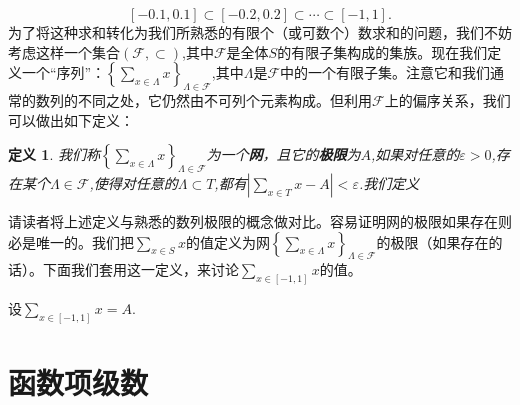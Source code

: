 \documentclass{article}
\newtheorem{definition}{定义}[subsection]
\begin{document}
$$[-0.1,0.1]\subset[-0.2,0.2]\subset\cdots\subset[-1,1].$$
为了将这种求和转化为我们所熟悉的有限个（或可数个）数求和的问题，我们不妨考虑这样一个集合$(\mathcal{F},\subset)$,其中$\mathcal{F}$是全体$S$的有限子集构成的集族。现在我们定义一个“序列”：$\left\{\sum_{x\in\Lambda}x\right\}_{\Lambda\in\mathcal{F}}$,其中$\Lambda$是$\mathcal{F}$中的一个有限子集。注意它和我们通常的数列的不同之处，它仍然由不可列个元素构成。但利用$\mathcal{F}$上的偏序关系，我们可以做出如下定义：
\begin{definition}
我们称$\left\{\sum_{x\in\Lambda}x\right\}_{\Lambda\in\mathcal{F}}$为一个\textbf{网}，且它的\textbf{极限}为$A$,如果对任意的$\varepsilon>0$,存在某个$\Lambda\in\mathcal{F}$,使得对任意的$\Lambda\subset T$,都有$\left|\sum_{x\in T}x-A\right|<\varepsilon$.我们定义
\end{definition}
请读者将上述定义与熟悉的数列极限的概念做对比。容易证明网的极限如果存在则必是唯一的。我们把$\sum_{x\in S}x$的值定义为网$\left\{\sum_{x\in\Lambda}x\right\}_{\Lambda\in\mathcal{F}}$的极限（如果存在的话）。下面我们套用这一定义，来讨论$\sum_{x\in[-1,1]}x$的值。\par
设$\sum_{x\in[-1,1]}x=A$.
\newpage
\section{函数项级数}
\end{document}
